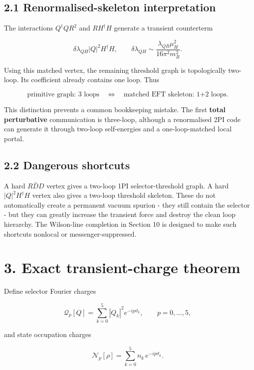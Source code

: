 \documentclass[
  10pt,
]{article}
\begin{document}
\subsection{2.1 Renormalised-skeleton
interpretation}\label{renormalised-skeleton-interpretation}

The interactions \(Q^\dagger QR^2\) and \(RH^\dagger H\) generate a
transient counterterm

\[
\delta\lambda_{QH}|Q|^2H^\dagger H,
\qquad
\delta\lambda_{QH}
\sim
\frac{\lambda_{QR}\mu_H^2}{16\pi^2m_R^2}.
\]

Using this matched vertex, the remaining threshold graph is
topologically two-loop. Its coefficient already contains one loop. Thus

\[
\boxed{
\text{primitive graph: 3 loops}
\quad\Longleftrightarrow\quad
\text{matched EFT skeleton: 1+2 loops}.}
\]

This distinction prevents a common bookkeeping mistake. The first
\textbf{total perturbative} communication is three-loop, although a
renormalised 2PI code can generate it through two-loop self-energies and
a one-loop-matched local portal.

\subsection{2.2 Dangerous shortcuts}\label{dangerous-shortcuts}

A hard \(R\bar DD\) vertex gives a two-loop 1PI selector-threshold
graph. A hard \(|Q|^2H^\dagger H\) vertex also gives a two-loop
threshold skeleton. These do not automatically create a permanent vacuum
spurion - they still contain the selector - but they can greatly
increase the transient force and destroy the clean loop hierarchy. The
Wilson-line completion in Section 10 is designed to make such shortcuts
nonlocal or messenger-suppressed.

\section{3. Exact transient-charge
theorem}\label{exact-transient-charge-theorem}

Define selector Fourier charges

\[
\mathcal Q_p[Q]
=
\sum_{k=0}^{5}|Q_k|^2e^{-ip\vartheta_k},
\qquad
p=0,\ldots,5,
\]

and state occupation charges

\[
\mathcal N_p[\rho]
=
\sum_{k=0}^{5}n_k\,e^{-ip\vartheta_k}.
\]
\end{document}
